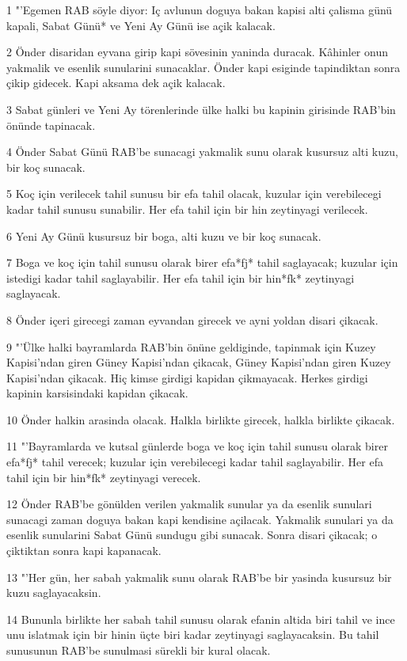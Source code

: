 \par 1 "'Egemen RAB söyle diyor: Iç avlunun doguya bakan kapisi alti çalisma günü kapali, Sabat Günü* ve Yeni Ay Günü ise açik kalacak.
\par 2 Önder disaridan eyvana girip kapi sövesinin yaninda duracak. Kâhinler onun yakmalik ve esenlik sunularini sunacaklar. Önder kapi esiginde tapindiktan sonra çikip gidecek. Kapi aksama dek açik kalacak.
\par 3 Sabat günleri ve Yeni Ay törenlerinde ülke halki bu kapinin girisinde RAB'bin önünde tapinacak.
\par 4 Önder Sabat Günü RAB'be sunacagi yakmalik sunu olarak kusursuz alti kuzu, bir koç sunacak.
\par 5 Koç için verilecek tahil sunusu bir efa tahil olacak, kuzular için verebilecegi kadar tahil sunusu sunabilir. Her efa tahil için bir hin zeytinyagi verilecek.
\par 6 Yeni Ay Günü kusursuz bir boga, alti kuzu ve bir koç sunacak.
\par 7 Boga ve koç için tahil sunusu olarak birer efa*fj* tahil saglayacak; kuzular için istedigi kadar tahil saglayabilir. Her efa tahil için bir hin*fk* zeytinyagi saglayacak.
\par 8 Önder içeri girecegi zaman eyvandan girecek ve ayni yoldan disari çikacak.
\par 9 "'Ülke halki bayramlarda RAB'bin önüne geldiginde, tapinmak için Kuzey Kapisi'ndan giren Güney Kapisi'ndan çikacak, Güney Kapisi'ndan giren Kuzey Kapisi'ndan çikacak. Hiç kimse girdigi kapidan çikmayacak. Herkes girdigi kapinin karsisindaki kapidan çikacak.
\par 10 Önder halkin arasinda olacak. Halkla birlikte girecek, halkla birlikte çikacak.
\par 11 "'Bayramlarda ve kutsal günlerde boga ve koç için tahil sunusu olarak birer efa*fj* tahil verecek; kuzular için verebilecegi kadar tahil saglayabilir. Her efa tahil için bir hin*fk* zeytinyagi verecek.
\par 12 Önder RAB'be gönülden verilen yakmalik sunular ya da esenlik sunulari sunacagi zaman doguya bakan kapi kendisine açilacak. Yakmalik sunulari ya da esenlik sunularini Sabat Günü sundugu gibi sunacak. Sonra disari çikacak; o çiktiktan sonra kapi kapanacak.
\par 13 "'Her gün, her sabah yakmalik sunu olarak RAB'be bir yasinda kusursuz bir kuzu saglayacaksin.
\par 14 Bununla birlikte her sabah tahil sunusu olarak efanin altida biri tahil ve ince unu islatmak için bir hinin üçte biri kadar zeytinyagi saglayacaksin. Bu tahil sunusunun RAB'be sunulmasi sürekli bir kural olacak.
